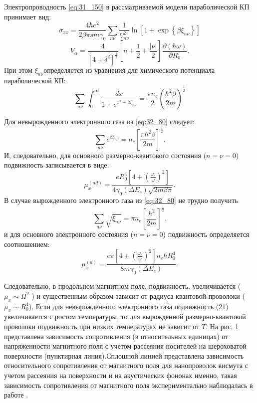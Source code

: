 Электропроводность \eqref{eq:31_150} в рассматриваемой модели параболической КП принимает вид:
\begin{equation} \label{eq:32_70}
\sigma _{xx} =\frac{4\hbar e^{2} }{2\beta \pi sm\gamma _{0} } \sum _{n\nu }\frac{1}{V_{n\nu }^{2} } \ln \left[1+\exp \left\{\beta \xi _{n\nu } \right\}\right]
\end{equation}
\[
V_{\alpha } =\frac{4}{\left[4+\delta ^{2} \right]^{\frac{1}{2} } } \left[n+\frac{1}{2} +\frac{\left|\nu \right|}{2} \right]\frac{\partial (\hbar \omega )}{\partial R_{0} } .
\] 
При этом $\xi _{n\nu } $определяется из уравнения для химического потенциала параболической КП:
\begin{equation} \label{eq:32_80}
\sum _{n\nu }\int _{0}^{\infty }\frac{dx}{1+e^{x^{2} -\beta \xi _{n\nu } } } =\frac{\pi n_{e} }{2} \left(\frac{\hbar ^{2} \beta }{2m} \right)^{\frac{1}{2} } 
\end{equation}

Для невырожденного электронного газа из \eqref{eq:32_80} следует:
\[
\sum _{n\nu }e^{\beta \xi _{n\nu } }  =n_{e} \left[\frac{\pi \hbar ^{2} \beta }{2m} \right]^{\frac{1}{2} } .
\] 
И, следовательно, для основного размерно-квантового состояния ($n=\nu =0$) подвижность записывается в виде:
\begin{equation} \label{eq:32_90}
\mu _{x}^{\left(nd\right)} =\frac{eR_{0}^{4} \left[4+\left(\frac{\omega _{c} }{\omega } \right)^{2} \right]}{4\gamma _{0} \left(\Delta E_{c} \right)\sqrt{2m\beta \pi } } . 
\end{equation}
В случае вырожденного электронного газа из \eqref{eq:32_80} не трудно получить
\[
\sum _{n\nu }\sqrt{\xi _{n\nu } }  =\pi n_{e} \left[\frac{\hbar ^{2} }{2m} \right]^{\frac{1}{2} } .
\] 
и для основного электронного состояния ($n=\nu =0$) подвижность определяется соотношением:
\begin{equation} \label{eq:32_100}
\mu _{x}^{\left(d\right)} =\frac{e\pi \left[4+\left(\frac{\omega _{c} }{\omega } \right)^{2} \right]n_{e} \hbar R_{0}^{4} }{8m\gamma _{0} \left(\Delta E_{c} \right)} .
\end{equation}
 
Следовательно, в продольном магнитном поле, подвижность, увеличивается ($\mu _{x} \sim H^{2} $ ) и существенным образом зависит от радиуса квантовой проволоки ($\mu _{x} \sim R_{0}^{4} $). Если для невырожденного электронного газа  подвижность (21) увеличивается с ростом температуры, то для вырожденной размерно-квантовой проволоки подвижность при низких температурах не зависит от $T$. На рис. 1 представлена зависимость сопротивления (в относительных единицах) от напряженности магнитного поля с учетом рассеяния носителей на шероховатой поверхности (пунктирная линия).Сплошной линией представлена зависимость относительного сопротивления от магнитного поля для нанопроволок висмута с учетом рассеяния на поверхности и на акустических фононах именно, такая зависимость сопротивления от магнитного поля экспериментально наблюдалась в работе \cite{Nikolaeva2004}.

